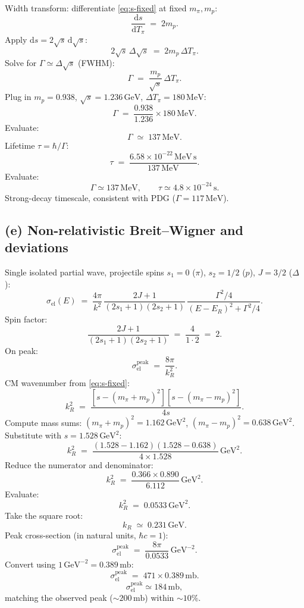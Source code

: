 \documentclass[11pt]{article}
\newcommand{\de}{\mathrm{d}}
\begin{document}
Width transform: differentiate \eqref{eq:s-fixed} at fixed $m_{\pi},m_{p}$:
\[
\frac{\de s}{\de T_{\pi}}\;=\;2m_{p}.
\]
Apply $\de s = 2\sqrt{s}\,\de\sqrt{s}$:
\[
2\sqrt{s}\,\Delta\sqrt{s}\;=\;2m_{p}\,\Delta T_{\pi}.
\]
Solve for $\Gamma\simeq\Delta\sqrt{s}$ (FWHM):
\[
\Gamma\;=\;\frac{m_{p}}{\sqrt{s}}\,\Delta T_{\pi}.
\]
Plug in $m_{p}=0.938$, $\sqrt{s}=1.236\,\text{GeV}$, $\Delta T_{\pi}=180\,\text{MeV}$:
\[
\Gamma\;=\;\frac{0.938}{1.236}\times 180\,\text{MeV}.
\]
Evaluate:
\[
\Gamma\;\simeq\;137\,\text{MeV}.
\]
Lifetime $\tau=\hbar/\Gamma$:
\[
\tau\;=\;\frac{6.58\times 10^{-22}\,\text{MeV}\,\text{s}}{137\,\text{MeV}}.
\]
Evaluate:
\begin{equation}
\boxed{\;\Gamma\simeq 137\,\text{MeV},\qquad\tau\simeq 4.8\times 10^{-24}\,\text{s}.\;}
\end{equation}
Strong-decay timescale, consistent with PDG ($\Gamma=117\,\text{MeV}$).

\subsection*{(e) Non-relativistic Breit--Wigner and deviations}

Single isolated partial wave, projectile spins $s_{1}=0$ ($\pi$), $s_{2}=1/2$ ($p$), $J=3/2$ ($\Delta$):
\begin{equation}
\sigma_\text{el}(E)\;=\;\frac{4\pi}{k^{2}}\,\frac{2J+1}{(2s_{1}+1)(2s_{2}+1)}\,\frac{\Gamma^{2}/4}{(E-E_{R})^{2}+\Gamma^{2}/4}.
\label{eq:BW-NR}
\end{equation}
Spin factor:
\[
\frac{2J+1}{(2s_{1}+1)(2s_{2}+1)}\;=\;\frac{4}{1\cdot 2}\;=\;2.
\]
On peak:
\[
\sigma_\text{el}^\text{peak}\;=\;\frac{8\pi}{k_{R}^{2}}.
\]
CM wavenumber from \eqref{eq:s-fixed}:
\[
k_{R}^{2}\;=\;\frac{[s-(m_{\pi}+m_{p})^{2}][s-(m_{\pi}-m_{p})^{2}]}{4s}.
\]
Compute mass sums: $(m_{\pi}+m_{p})^{2}=1.162\,\text{GeV}^{2}$, $(m_{\pi}-m_{p})^{2}=0.638\,\text{GeV}^{2}$.
Substitute with $s=1.528\,\text{GeV}^{2}$:
\[
k_{R}^{2}\;=\;\frac{(1.528-1.162)(1.528-0.638)}{4\times 1.528}\,\text{GeV}^{2}.
\]
Reduce the numerator and denominator:
\[
k_{R}^{2}\;=\;\frac{0.366\times 0.890}{6.112}\,\text{GeV}^{2}.
\]
Evaluate:
\[
k_{R}^{2}\;=\;0.0533\,\text{GeV}^{2}.
\]
Take the square root:
\[
k_{R}\;\simeq\;0.231\,\text{GeV}.
\]
Peak cross-section (in natural units, $\hbar c=1$):
\[
\sigma_\text{el}^\text{peak}\;=\;\frac{8\pi}{0.0533}\,\text{GeV}^{-2}.
\]
Convert using $1\,\text{GeV}^{-2}=0.389\,\text{mb}$:
\[
\sigma_\text{el}^\text{peak}\;=\;471\times 0.389\,\text{mb}.
\]
\begin{equation}
\boxed{\;\sigma_\text{el}^\text{peak}\simeq 184\,\text{mb},\;}
\end{equation}
matching the observed peak ($\sim 200\,\text{mb}$) within ${\sim}10\%$.
\end{document}
